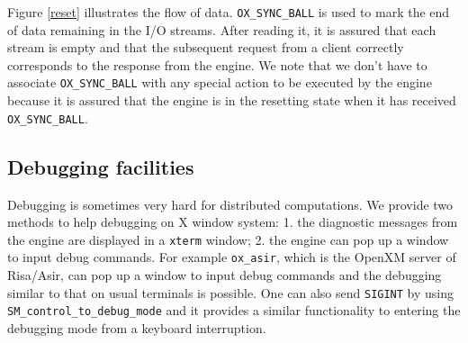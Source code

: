 Figure \ref{reset} illustrates the flow of data.
{\tt OX\_SYNC\_BALL} is used to mark the end of data remaining in the
I/O streams. After reading it, it is assured that each stream is empty
and that the subsequent request from a client correctly 
corresponds to the response from the engine.
We note that we don't have to associate {\tt OX\_SYNC\_BALL} with
any special action to be executed by the engine because it is
assured that the engine is in the resetting state when it has received
{\tt OX\_SYNC\_BALL}.

\subsection{Debugging facilities}
Debugging is sometimes very hard for distributed computations.
We provide two methods to help debugging on X window system:
1. the diagnostic messages from the engine are displayed in a {\tt xterm}
window;
2. the engine can pop up a window to input debug commands.
For example {\tt ox\_asir}, which is
the OpenXM server of Risa/Asir, can pop up a window to input
debug commands and the debugging similar to that on usual terminals is possible.
One can also send {\tt SIGINT} by using {\tt SM\_control\_to\_debug\_mode}
and it provides a similar functionality to entering the debugging
mode from a keyboard interruption.
